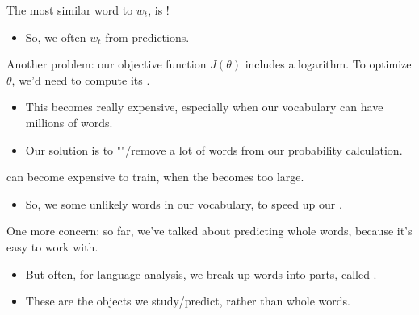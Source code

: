         \begin{concept}
            The most similar word to $w_t$, is !

            \begin{itemize}
                \item So, we often  $w_t$ from predictions.
            \end{itemize}
        \end{concept}

        \subsecdiv

        Another problem: our objective function $J(\theta)$ includes a logarithm. To optimize $\theta$, we'd need to compute its .

        \begin{itemize}
            \item This becomes really expensive, especially when our vocabulary can have millions of words.

            \item Our solution is to ""/remove a lot of words from our probability calculation.
                \\
        \end{itemize}
            
        \begin{concept}
             can become expensive to train, when the  becomes too large.

            \begin{itemize}
                \item So, we  some unlikely words in our vocabulary, to speed up our .
            \end{itemize}
        \end{concept}

        \subsecdiv

        One more concern: so far, we've talked about predicting whole words, because it's easy to work with.

        \begin{itemize}
            \item But often, for language analysis, we break up words into parts, called .

            \item These are the objects we study/predict, rather than whole words.\\
        \end{itemize}

